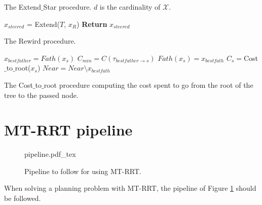  \begin{algorithm}
 \caption{The Extend$\_$Star procedure.  $d$ is the cardinality of $\mathcal{X}$.
 \label{alg:Expand_star}}
 $x_{steered}$ = Extend($T$, $x_R$)\;
 \textbf{Return} $x_{steered}$\;
 \end{algorithm}

 \begin{algorithm}
 \caption{The Rewird procedure.
 \label{alg:rewird}}
 $x_{best father} = Fath(x_s)$\;
 $C_{min} = C(\tau_{best father \rightarrow s})$\;
 $Fath(x_s) = x_{best fath}$\;
 $C_s=$Cost$\_$to$\_$root($x_s$)\;
 $Near = Near \setminus x_{best fath}$\;
 \end{algorithm}

 \begin{algorithm}
 \caption{The Cost$\_$to$\_$root procedure computing the cost spent to go from the root of the tree to the passed node.
 \label{alg:cost_to_root}}
 \end{algorithm}

\section{MT-RRT pipeline}
\label{sec:pipeline}

 \begin{figure}
	 \centering
 \def\svgwidth{0.9 \columnwidth}
 {pipeline.pdf_tex} 
	 \caption{Pipeline to follow for using MT-RRT.}
 \label{fig:pipeline}
 \end{figure}

When solving a planning problem with MT-RRT, the pipeline of Figure \ref{fig:pipeline} should be followed.

